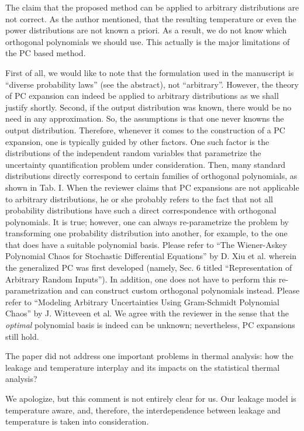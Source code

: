 \begin{reviewer}
The claim that the proposed method can be applied to arbitrary distributions are not correct. As the author mentioned, that the resulting temperature or even the power distributions are not known a priori. As a result, we do not know which orthogonal polynomials we should use. This actually is the major limitations of the PC based method.
\end{reviewer}
\begin{authors}
First of all, we would like to note that the formulation used in the manuscript is ``diverse probability laws'' (see the abstract), not ``arbitrary''.
However, the theory of PC expansion can indeed be applied to arbitrary distributions as we shall justify shortly.
Second, if the output distribution was known, there would be no need in any approximation.
So, the assumptions is that one never knowns the output distribution.
Therefore, whenever it comes to the construction of a PC expansion, one is typically guided by other factors. One such factor is the distributions of the independent random variables that parametrize the uncertainty quantification problem under consideration.
Then, many standard distributions directly correspond to certain families of orthogonal polynomials, as shown in Tab. I.
When the reviewer claims that PC expansions are not applicable to arbitrary distributions, he or she probably refers to the fact that not all probability distributions have such a direct correspondence with orthogonal polynomials.
It is true; however, one can always re-parametrize the problem by transforming one probability distribution into another, for example, to the one that does have a suitable polynomial basis.
Please refer to ``The Wiener-Askey Polynomial Chaos for Stochastic Differential Equations'' by D. Xiu et al. wherein the generalized PC was first developed (namely, Sec. 6 titled ``Representation of Arbitrary Random Inputs'').
In addition, one does not have to perform this re-parametrization and can construct custom orthogonal polynomials instead.
Please refer to ``Modeling Arbitrary Uncertainties Using Gram-Schmidt Polynomial Chaos'' by J. Witteveen et al. We agree with the reviewer in the sense that the \emph{optimal} polynomial basis is indeed can be unknown; nevertheless, PC expansions still hold.
\end{authors}

\begin{reviewer}
The paper did not address one important problems in thermal analysis: how the leakage and temperature interplay and its impacts on the statistical thermal analysis?
\end{reviewer}
\begin{authors}
We apologize, but this comment is not entirely clear for us.
Our leakage model is temperature aware, and, therefore, the interdependence between leakage and temperature is taken into consideration.
\end{authors}


